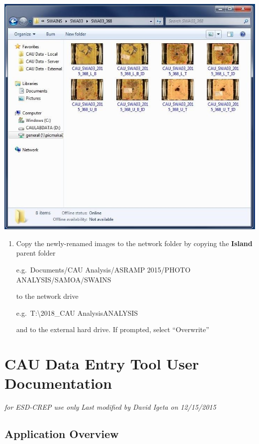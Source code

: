 \documentclass[]{book}
\begin{document}
\includegraphics{images/Camera18.jpg}

\begin{enumerate}
\def\labelenumi{\arabic{enumi}.}
\setcounter{enumi}{20}
\item
  Copy the newly-renamed images to the network folder by copying the \textbf{Island} parent folder

  e.g.~Documents/CAU Analysis/ASRAMP 2015/PHOTO ANALYSIS/SAMOA/SWAINS

  to the network drive

  e.g.~T:\Oceanography\CAUs\Analysis\textbackslash2018\_CAU Analysis\PHOTO ANALYSIS\SAMOA\SWAINS  

  and to the external hard drive. If prompted, select ``Overwrite''
\end{enumerate}

\hypertarget{cau-data-entry-tool-user-documentation}{%
\section{CAU Data Entry Tool User Documentation}\label{cau-data-entry-tool-user-documentation}}

\emph{for ESD-CREP use only}
\emph{Last modified by David Igeta on 12/15/2015}

\hypertarget{application-overview}{%
\subsection{Application Overview}\label{application-overview}}
\end{document}
